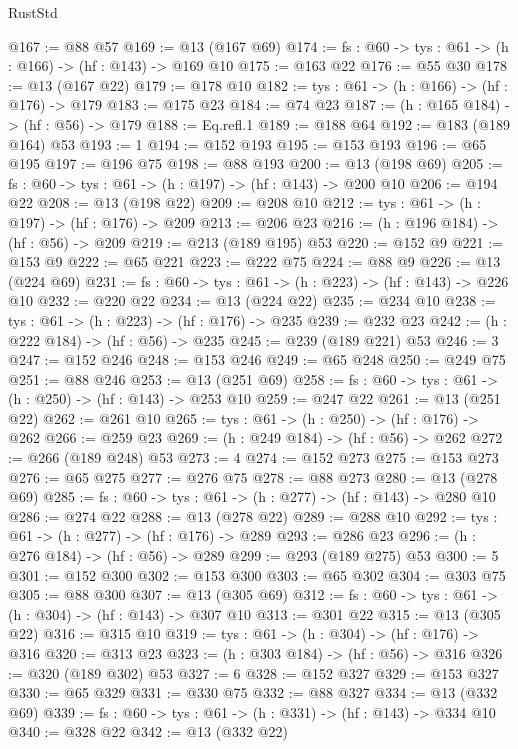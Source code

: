 \begin{lexlean}{RustStd}
\begin{coremodule}
@167 := @88 @57
@169 := @13 (@167 @69)
@174 := {fs : @60} -> {tys : @61} -> (h : @166) -> (hf : @143) -> @169 @10
@175 := @163 @22
@176 := @55 @30
@178 := @13 (@167 @22)
@179 := @178 @10
@182 := {tys : @61} -> (h : @166) -> (hf : @176) -> @179
@183 := @175 @23
@184 := @74 @23
@187 := (h : @165 @184) -> (hf : @56) -> @179
@188 := Eq.refl.{1}
@189 := @188 @64
@192 := @183 (@189 @164) @53
@193 := 1
@194 := @152 @193
@195 := @153 @193
@196 := @65 @195
@197 := @196 @75
@198 := @88 @193
@200 := @13 (@198 @69)
@205 := {fs : @60} -> {tys : @61} -> (h : @197) -> (hf : @143) -> @200 @10
@206 := @194 @22
@208 := @13 (@198 @22)
@209 := @208 @10
@212 := {tys : @61} -> (h : @197) -> (hf : @176) -> @209
@213 := @206 @23
@216 := (h : @196 @184) -> (hf : @56) -> @209
@219 := @213 (@189 @195) @53
@220 := @152 @9
@221 := @153 @9
@222 := @65 @221
@223 := @222 @75
@224 := @88 @9
@226 := @13 (@224 @69)
@231 := {fs : @60} -> {tys : @61} -> (h : @223) -> (hf : @143) -> @226 @10
@232 := @220 @22
@234 := @13 (@224 @22)
@235 := @234 @10
@238 := {tys : @61} -> (h : @223) -> (hf : @176) -> @235
@239 := @232 @23
@242 := (h : @222 @184) -> (hf : @56) -> @235
@245 := @239 (@189 @221) @53
@246 := 3
@247 := @152 @246
@248 := @153 @246
@249 := @65 @248
@250 := @249 @75
@251 := @88 @246
@253 := @13 (@251 @69)
@258 := {fs : @60} -> {tys : @61} -> (h : @250) -> (hf : @143) -> @253 @10
@259 := @247 @22
@261 := @13 (@251 @22)
@262 := @261 @10
@265 := {tys : @61} -> (h : @250) -> (hf : @176) -> @262
@266 := @259 @23
@269 := (h : @249 @184) -> (hf : @56) -> @262
@272 := @266 (@189 @248) @53
@273 := 4
@274 := @152 @273
@275 := @153 @273
@276 := @65 @275
@277 := @276 @75
@278 := @88 @273
@280 := @13 (@278 @69)
@285 := {fs : @60} -> {tys : @61} -> (h : @277) -> (hf : @143) -> @280 @10
@286 := @274 @22
@288 := @13 (@278 @22)
@289 := @288 @10
@292 := {tys : @61} -> (h : @277) -> (hf : @176) -> @289
@293 := @286 @23
@296 := (h : @276 @184) -> (hf : @56) -> @289
@299 := @293 (@189 @275) @53
@300 := 5
@301 := @152 @300
@302 := @153 @300
@303 := @65 @302
@304 := @303 @75
@305 := @88 @300
@307 := @13 (@305 @69)
@312 := {fs : @60} -> {tys : @61} -> (h : @304) -> (hf : @143) -> @307 @10
@313 := @301 @22
@315 := @13 (@305 @22)
@316 := @315 @10
@319 := {tys : @61} -> (h : @304) -> (hf : @176) -> @316
@320 := @313 @23
@323 := (h : @303 @184) -> (hf : @56) -> @316
@326 := @320 (@189 @302) @53
@327 := 6
@328 := @152 @327
@329 := @153 @327
@330 := @65 @329
@331 := @330 @75
@332 := @88 @327
@334 := @13 (@332 @69)
@339 := {fs : @60} -> {tys : @61} -> (h : @331) -> (hf : @143) -> @334 @10
@340 := @328 @22
@342 := @13 (@332 @22)

\end{coremodule}
\end{lexlean}
